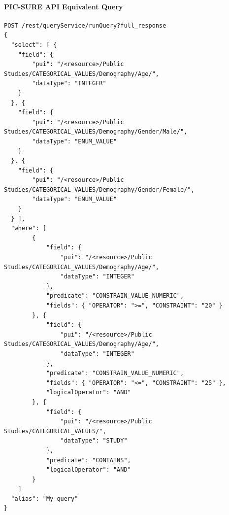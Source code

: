\paragraph{PIC-SURE API Equivalent Query}
\begin{verbatim}
POST /rest/queryService/runQuery?full_response
{
  "select": [ {
    "field": {
        "pui": "/<resource>/Public Studies/CATEGORICAL_VALUES/Demography/Age/",
        "dataType": "INTEGER"
    }
  }, {
    "field": {
        "pui": "/<resource>/Public Studies/CATEGORICAL_VALUES/Demography/Gender/Male/",
        "dataType": "ENUM_VALUE"
    }
  }, {
    "field": {
        "pui": "/<resource>/Public Studies/CATEGORICAL_VALUES/Demography/Gender/Female/",
        "dataType": "ENUM_VALUE"
    }
  } ],
  "where": [
        {
            "field": {
                "pui": "/<resource>/Public Studies/CATEGORICAL_VALUES/Demography/Age/",
                "dataType": "INTEGER"
            },
            "predicate": "CONSTRAIN_VALUE_NUMERIC",
            "fields": { "OPERATOR": ">=", "CONSTRAINT": "20" }
        }, {
            "field": {
                "pui": "/<resource>/Public Studies/CATEGORICAL_VALUES/Demography/Age/",
                "dataType": "INTEGER"
            },
            "predicate": "CONSTRAIN_VALUE_NUMERIC",
            "fields": { "OPERATOR": "<=", "CONSTRAINT": "25" },
            "logicalOperator": "AND"
        }, {
            "field": {
                "pui": "/<resource>/Public Studies/CATEGORICAL_VALUES/",
                "dataType": "STUDY"
            },
            "predicate": "CONTAINS",
            "logicalOperator": "AND"
        }
    ]
  "alias": "My query"
}
\end{verbatim}

